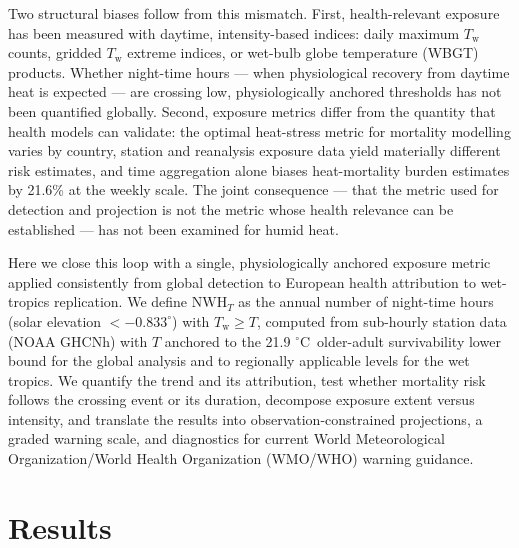 \documentclass[12pt,a4paper]{article}
\newcommand{\dd}{\ensuremath{\,^{\circ}\mathrm{C}}}
\begin{document}
Two structural biases follow from this mismatch. First, health-relevant exposure has been measured
with daytime, intensity-based indices: daily maximum $T_\mathrm{w}$ counts\citep{Raymond2020},
gridded $T_\mathrm{w}$ extreme indices\citep{Willett2023,Willett2023PartI}, or wet-bulb globe
temperature (WBGT) products\citep{Brimicombe2023}. Whether night-time hours --- when physiological
recovery from daytime heat is expected\citep{Kim2023,Wu2025} --- are crossing low, physiologically
anchored thresholds has not been quantified globally. Second, exposure metrics differ from the
quantity that health models can validate: the optimal heat-stress metric for mortality modelling
varies by country\citep{Lo2023}, station and reanalysis exposure data yield materially different
risk estimates\citep{Mistry2022}, and time aggregation alone biases heat-mortality burden estimates
by 21.6\% at the weekly scale\citep{Ballester2024}. The joint consequence --- that the metric used
for detection and projection is not the metric whose health relevance can be established --- has
not been examined for humid heat.

Here we close this loop with a single, physiologically anchored exposure metric applied consistently
from global detection to European health attribution to wet-tropics replication. We define
$\mathrm{NWH}_T$ as the annual number of night-time hours (solar elevation $<-0.833^\circ$) with
$T_\mathrm{w}\geq T$, computed from sub-hourly station data (NOAA GHCNh) with $T$ anchored to the
21.9\,\dd~older-adult survivability lower bound\citep{Vanos2023} for the global analysis and to
regionally applicable levels for the wet tropics. We quantify the trend and its attribution, test
whether mortality risk follows the crossing event or its duration, decompose exposure extent versus
intensity, and translate the results into observation-constrained projections, a graded warning
scale, and diagnostics for current World Meteorological Organization/World Health Organization
(WMO/WHO) warning guidance\citep{WMOWHO2015,ISO7243}.

\section*{Results}
\end{document}
